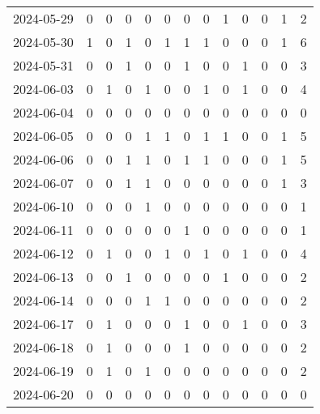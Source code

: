 \documentclass[dvipdfmx,oneside]{article}
\begin{document}
\begin{longtable}{lcccccccccccc}
        2024-05-29 &     0 &     0 &     0 &     0 &     0 &     0 &     0 &     1 &     0 &     0 &     1 &      2 \\
        2024-05-30 &     1 &     0 &     1 &     0 &     1 &     1 &     1 &     0 &     0 &     0 &     1 &      6 \\
        2024-05-31 &     0 &     0 &     1 &     0 &     0 &     1 &     0 &     0 &     1 &     0 &     0 &      3 \\
        2024-06-03 &     0 &     1 &     0 &     1 &     0 &     0 &     1 &     0 &     1 &     0 &     0 &      4 \\
        2024-06-04 &     0 &     0 &     0 &     0 &     0 &     0 &     0 &     0 &     0 &     0 &     0 &      0 \\
        2024-06-05 &     0 &     0 &     0 &     1 &     1 &     0 &     1 &     1 &     0 &     0 &     1 &      5 \\
        2024-06-06 &     0 &     0 &     1 &     1 &     0 &     1 &     1 &     0 &     0 &     0 &     1 &      5 \\
        2024-06-07 &     0 &     0 &     1 &     1 &     0 &     0 &     0 &     0 &     0 &     0 &     1 &      3 \\
        2024-06-10 &     0 &     0 &     0 &     1 &     0 &     0 &     0 &     0 &     0 &     0 &     0 &      1 \\
        2024-06-11 &     0 &     0 &     0 &     0 &     0 &     1 &     0 &     0 &     0 &     0 &     0 &      1 \\
        2024-06-12 &     0 &     1 &     0 &     0 &     1 &     0 &     1 &     0 &     1 &     0 &     0 &      4 \\
        2024-06-13 &     0 &     0 &     1 &     0 &     0 &     0 &     0 &     1 &     0 &     0 &     0 &      2 \\
        2024-06-14 &     0 &     0 &     0 &     1 &     1 &     0 &     0 &     0 &     0 &     0 &     0 &      2 \\
        2024-06-17 &     0 &     1 &     0 &     0 &     0 &     1 &     0 &     0 &     1 &     0 &     0 &      3 \\
        2024-06-18 &     0 &     1 &     0 &     0 &     0 &     1 &     0 &     0 &     0 &     0 &     0 &      2 \\
        2024-06-19 &     0 &     1 &     0 &     1 &     0 &     0 &     0 &     0 &     0 &     0 &     0 &      2 \\
        2024-06-20 &     0 &     0 &     0 &     0 &     0 &     0 &     0 &     0 &     0 &     0 &     0 &      0 \\

\end{longtable}
\end{document}

